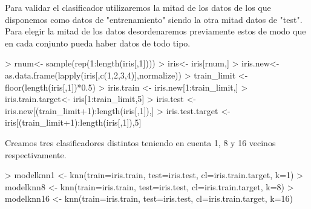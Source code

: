 \documentclass [a4paper] {article}
\begin{document}
Para validar el clasificador utilizaremos la mitad de los datos de los que disponemos como datos de "entrenamiento" siendo la otra mitad datos de "test".
Para elegir la mitad de los datos desordenaremos previamente estos de modo que en cada conjunto pueda haber datos de todo tipo.
\begin{Schunk}
\begin{Sinput}
> rnum<- sample(rep(1:length(iris[,1])))
> iris<- iris[rnum,]
> iris.new<- as.data.frame(lapply(iris[,c(1,2,3,4)],normalize))
> train_limit <- floor(length(iris[,1])*0.5)
> iris.train <- iris.new[1:train_limit,]
> iris.train.target<- iris[1:train_limit,5]
> iris.test <- iris.new[(train_limit+1):length(iris[,1]),]
> iris.test.target <- iris[(train_limit+1):length(iris[,1]),5]
\end{Sinput}
\end{Schunk}

Creamos tres clasificadores distintos teniendo en cuenta 1, 8 y 16 vecinos respectivamente.
\begin{Schunk}
\begin{Sinput}
> modelknn1 <- knn(train=iris.train, test=iris.test, cl=iris.train.target, k=1)
> modelknn8 <- knn(train=iris.train, test=iris.test, cl=iris.train.target, k=8)
> modelknn16 <- knn(train=iris.train, test=iris.test, cl=iris.train.target, k=16)
\end{Sinput}
\end{Schunk}
\end{document}
